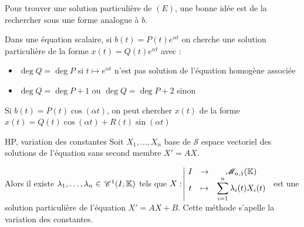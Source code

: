 \begin{remarque}
    Pour trouver une solution particulière de $(E)$, une bonne idée est de la rechercher sous 
    une forme analogue à $b$. 
\end{remarque}

\begin{exemple}
    Dans une équation scalaire, si $b(t) = P(t)e^{\alpha t}$ on cherche une solution 
    particulière de la forme $x(t) = Q(t)e^{\alpha t}$ avec : 
    \begin{itemize}
        \item $\deg Q = \deg P$ si $t \mapsto e^{\alpha t}$ n'est pas solution de l'équation homogène associée
        \item $\deg Q = \deg P + 1$ ou $\deg Q = \deg P + 2$ sinon
    \end{itemize}

    Si $b(t) = P(t) \cos (\alpha t)$, on peut chercher $x(t)$ de la forme 
    $x(t) = Q(t) \cos (\alpha t) + R(t) \sin (\alpha t)$
\end{exemple}

\begin{theoreme}{HP, variation des constantes}{}
    Soit $X_1, \dots, X_n$ base de $\mathscr S$ espace vectoriel des solutions de 
    l'équation sans second membre $X' = AX$.

    Alors il existe $\lambda_1, \dots, \lambda_n \in \,\mathscr C^{1}(I, \mathbb{K})$ tels que 
    $X: \space \begin{array}{|ccc} \displaystyle I & \to & \displaystyle \mathscr M_{n, 1}(\mathbb{K}) \\ \displaystyle t & \mapsto & \displaystyle \sum_{i = 1}^n \lambda_i(t) X_i(t) \end{array}$ est une solution 
    particulière de l'équation $X' = AX + B$. Cette méthode s'apelle la variation des constantes. 
\end{theoreme}


